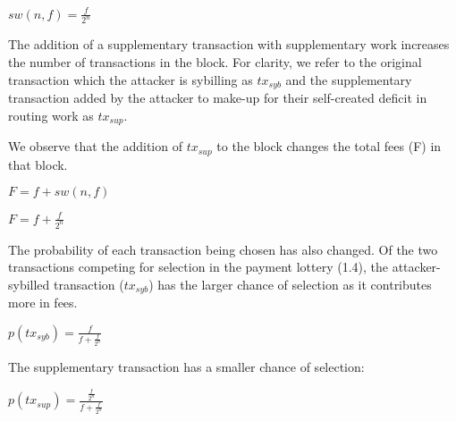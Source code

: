 \documentclass[oneside]{article}   	%
\begin{document}
\begin{multicols}{2}
\large
\begin{adjustwidth}{1.5em}{1.5em} 
	\begin{math}
sw(n, f) = \frac{f}{2^n}
	\end{math}
\end{adjustwidth}
\normalsize

The addition of a supplementary transaction with supplementary work increases the number of transactions in the block. For clarity, we refer to the original transaction which the attacker is sybilling as \begin{math}tx_{syb}\end{math} and the supplementary transaction added by the attacker to make-up for their self-created deficit in routing work as \begin{math}tx_{sup}\end{math}.

We observe that the addition of \begin{math}tx_{sup}\end{math} to the block changes the total fees (F) in that block.

\large
\begin{adjustwidth}{1.5em}{1.5em} 
	\begin{math}
F = f + sw(n, f)
	\end{math}

	\begin{math}
F = f + \frac{f}{2^{n}}
	\end{math}
\end{adjustwidth}
\normalsize

The probability of each transaction being chosen has also changed. Of the two transactions competing for selection in the payment lottery (1.4), the attacker-sybilled transaction (\begin{math}tx_{syb}\end{math}) has the larger chance of selection as it contributes more in fees.

\large
\begin{adjustwidth}{1.5em}{1.5em} 
	\begin{math}
p(tx_{syb}) = \frac{f}{f + \frac{f}{2^n}}
	\end{math}
\end{adjustwidth}
\normalsize

The supplementary transaction has a smaller chance of selection:

\large
\begin{adjustwidth}{1.5em}{1.5em} 
	\begin{math}
p(tx_{sup}) = \frac{\frac{f}{2^n}}{f + \frac{f}{2^n}}
	\end{math}
\end{adjustwidth}
\normalsize


\end{multicols}
\end{document}
